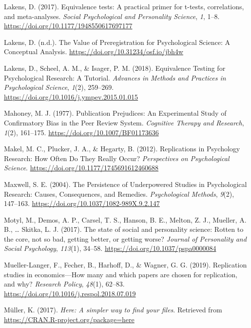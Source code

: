 \documentclass[british,,man,floatsintext]{apa6}
\begin{document}
\leavevmode\hypertarget{ref-R-TOSTER}{}%
Lakens, D. (2017). Equivalence tests: A practical primer for t-tests, correlations, and meta-analyses. \emph{Social Psychological and Personality Science}, \emph{1}, 1--8. \url{https://doi.org/10.1177/1948550617697177}

\leavevmode\hypertarget{ref-Lakens2019b}{}%
Lakens, D. (n.d.). The Value of Preregistration for Psychological Science: A Conceptual Analysis. \url{https://doi.org/10.31234/osf.io/jbh4w}

\leavevmode\hypertarget{ref-Lakens2018a}{}%
Lakens, D., Scheel, A. M., \& Isager, P. M. (2018). Equivalence Testing for Psychological Research: A Tutorial. \emph{Advances in Methods and Practices in Psychological Science}, \emph{1}(2), 259--269. \url{https://doi.org/10.1016/j.ympev.2015.01.015}

\leavevmode\hypertarget{ref-Mahoney1977}{}%
Mahoney, M. J. (1977). Publication Prejudices: An Experimental Study of Confirmatory Bias in the Peer Review System. \emph{Cognitive Therapy and Research}, \emph{1}(2), 161--175. \url{https://doi.org/10.1007/BF01173636}

\leavevmode\hypertarget{ref-Makel2012}{}%
Makel, M. C., Plucker, J. A., \& Hegarty, B. (2012). Replications in Psychology Research: How Often Do They Really Occur? \emph{Perspectives on Psychological Science}. \url{https://doi.org/10.1177/1745691612460688}

\leavevmode\hypertarget{ref-Maxwell2004}{}%
Maxwell, S. E. (2004). The Persistence of Underpowered Studies in Psychological Research: Causes, Consequences, and Remedies. \emph{Psychological Methods}, \emph{9}(2), 147--163. \url{https://doi.org/10.1037/1082-989X.9.2.147}

\leavevmode\hypertarget{ref-Motyl2017}{}%
Motyl, M., Demos, A. P., Carsel, T. S., Hanson, B. E., Melton, Z. J., Mueller, A. B., \ldots{} Skitka, L. J. (2017). The state of social and personality science: Rotten to the core, not so bad, getting better, or getting worse? \emph{Journal of Personality and Social Psychology}, \emph{113}(1), 34--58. \url{https://doi.org/10.1037/pspa0000084}

\leavevmode\hypertarget{ref-Mueller-Langer2019}{}%
Mueller-Langer, F., Fecher, B., Harhoff, D., \& Wagner, G. G. (2019). Replication studies in economics---How many and which papers are chosen for replication, and why? \emph{Research Policy}, \emph{48}(1), 62--83. \url{https://doi.org/10.1016/j.respol.2018.07.019}

\leavevmode\hypertarget{ref-R-here}{}%
Müller, K. (2017). \emph{Here: A simpler way to find your files}. Retrieved from \url{https://CRAN.R-project.org/package=here}
\end{document}
